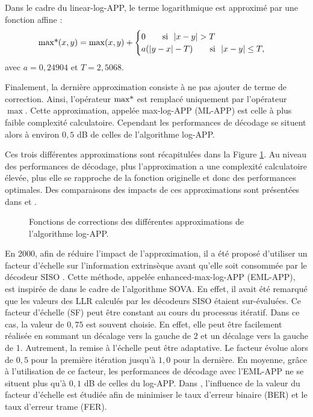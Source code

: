 Dans le cadre du linear-log-APP, le terme logarithmique est approximé par une fonction affine \cite{linearlog} : 
\begin{equation}
	\operatorname*{max*}(x,y)=\max(x,y) + \begin{cases} 0 \qquad\text{si~~} |x-y| > T \\
	a(|y-x|-T) \qquad\text{si~~} |x-y| \leq T, \end{cases}
\end{equation}
avec $a=0,24904$ et $T=2,5068$.

Finalement, la dernière approximation consiste à ne pas ajouter de terme de correction. Ainsi, l'opérateur $\operatorname*{max*}$ est 
remplacé uniquement par l'opérateur $\max$. Cette approximation, appelée max-log-APP (ML-APP) est celle à plus faible 
complexité calculatoire. Cependant les performances de décodage se situent alors à environ $0,5$ dB de celles de l'algorithme 
log-APP.

Ces trois différentes approximations sont récapitulées dans la Figure \ref{fig:logapprox}. Au niveau des performances de 
décodage, plus l'approximation a une complexité calculatoire élevée, plus elle se rapproche de la fonction originelle et 
donc des performances optimales. Des comparaisons des impacts de ces approximations sont présentées dans \cite{robertson1995comparison} et \cite{logapprox}.
\begin{figure}[!h]
	\centering
	
	\caption{\label{fig:logapprox} Fonctions de corrections des différentes approximations de l'algorithme log-APP.} 
\end{figure}

En 2000, afin de réduire l'impact de l'approximation, il a été proposé d'utiliser un facteur d'échelle sur l'information extrinsèque avant qu'elle soit 
consommée par le décodeur SISO \cite{enhancedmlmap}. Cette méthode, appelée enhanced-max-log-APP (EML-APP), est 
inspirée de \cite{HagenHoerViter} dans le cadre de l'algorithme SOVA. En effet, il avait été remarqué que les valeurs 
des LLR calculés par les décodeurs SISO étaient sur-évaluées.
Ce facteur d'échelle (SF) peut être constant au cours du processus itératif. Dans ce cas, la valeur de $0,75$ est 
souvent choisie. En effet, elle peut être facilement réalisée en sommant un décalage vers la gauche de 2 et un décalage 
vers la gauche de 1. Autrement, la remise à l'échelle peut être adaptative. Le facteur évolue alors de $0,5$ pour la 
première itération jusqu'à $1,0$ pour la dernière. En moyenne, grâce à l'utilisation de ce facteur, les performances de 
décodage avec l'EML-APP ne se situent plus qu'à $0,1$ dB de celles du log-APP.
Dans \cite{scaling}, l'influence de la valeur du facteur d'échelle est étudiée afin de minimiser le taux d'erreur binaire
(BER) et le taux d'erreur trame (FER).


